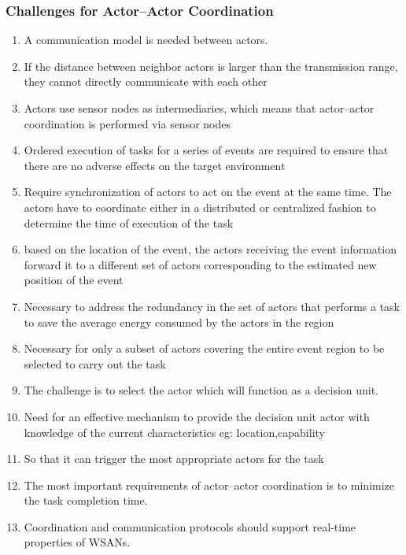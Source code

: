 \documentclass[11pt]{class}
\begin{document}
										\begin{frame}
											\frametitle{Challenges for Actor–Actor Coordination}
											\begin{enumerate}
												\item A communication model is needed between actors. 
												\item If the distance between neighbor actors is larger than the transmission range, they cannot directly communicate with each other
												\item Actors use sensor nodes as intermediaries, which means that actor–actor coordination is performed via sensor nodes
												\item Ordered execution of tasks for a series of events are required to ensure that there are no adverse effects on the target environment
												\item Require synchronization of actors to act on the event at the same time. The actors have to coordinate either in a distributed or centralized fashion to determine the time of execution of the task
												\item based on the location of the event, the actors receiving the event information forward it to a different set of actors corresponding to the estimated new position of the event
												\item Necessary to address the redundancy in the set of actors that performs a task  to save  the average energy consumed by the actors in the region
												\item Necessary for only a subset of actors covering the entire event region to be selected to carry out the task
												\item The challenge is to select the actor which will function as a decision unit. 
												\item Need for an effective mechanism to provide the decision unit actor with knowledge of the current characteristics eg: location,capability
												\item So that it can trigger the most appropriate actors for the task
												\item The most important requirements of actor–actor coordination is to minimize the task completion time.
												\item Coordination and communication protocols should support real-time properties of WSANs.
											\end{enumerate}
										\end{frame}
										
\end{document}
